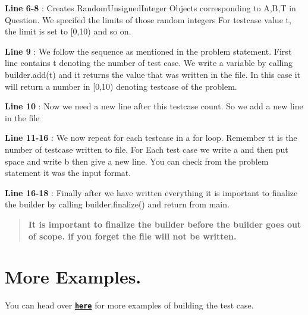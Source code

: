 {\bfseries Line 6-\/8 } \+: Creates Random\+Unsigned\+Integer Objects corresponding to A,B,T in Question. We specifed the limits of those random integers For testcase value t, the limit is set to \mbox{[}0,10) and so on.

{\bfseries Line 9 } \+: We follow the sequence as mentioned in the problem statement. First line contains t denoting the number of test case. We write a variable by calling {\ttfamily builder.\+add(t)} and it returns the value that was written in the file. In this case it will return a number in \mbox{[}0,10) denoting testcase of the problem.

{\bfseries Line 10} \+: Now we need a new line after this testcase count. So we add a new line in the file

{\bfseries Line 11-\/16 } \+: We now repeat for each testcase in a for loop. Remember {\ttfamily tt} is the number of testcase written to file. For Each test case we write \textquotesingle{}a\textquotesingle{} and then put space and write \textquotesingle{}b\textquotesingle{} then give a new line. You can check from the problem statement it was the input format.

{\bfseries Line 16-\/18 } \+: Finally after we have written everything it is important to finalize the builder by calling {\ttfamily builder.\+finalize()} and return from main.

\begin{quote}
{\bfseries It is important to finalize the builder before the builder goes out of scope. if you forget the file will not be written. } \end{quote}
\hypertarget{index_more_example}{}\section{More Examples.}\label{index_more_example}
You can head over \href{https://github.com/coder3101/testcaser/tree/master/examples}{\tt {\bfseries here}} for more examples of building the test case. 